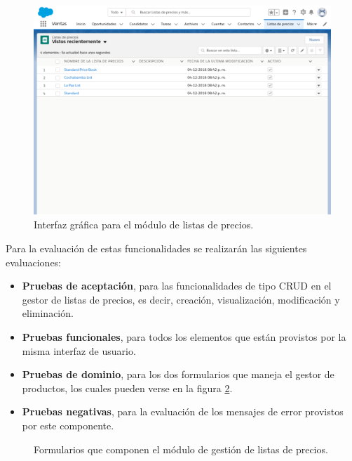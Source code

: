 \begin{figure}
\centering
\includegraphics[width=1.0\textwidth]{graphics/listas_de_precios.eps}
\caption{Interfaz gráfica para el módulo de listas de precios.}
\label{listas_de_precios_web}
\end{figure}

Para la evaluación de estas funcionalidades se realizarán las siguientes
evaluaciones:

\begin{itemize}
\item \textbf{Pruebas de aceptación}, para las funcionalidades de tipo CRUD en
    el gestor de listas de precios, es decir, creación, visualización,
    modificación y eliminación.
\item \textbf{Pruebas funcionales}, para todos los elementos que están provistos
    por la misma interfaz de usuario.
\item \textbf{Pruebas de dominio}, para los dos formularios que maneja el
    gestor de productos, los cuales pueden verse en la figura \ref{listas_de_precios_formularios}.
\item \textbf{Pruebas negativas}, para la evaluación de los mensajes de error
    provistos por este componente.
\end{itemize}

\begin{figure}
\centering
{}
\caption{Formularios que componen el módulo de gestión de listas de precios.}
\label{listas_de_precios_formularios}
\end{figure}

